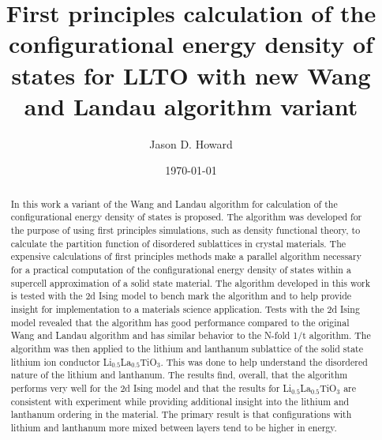 \documentclass[aps,pre,reprint,superscriptaddress,showkeys]{revtex4-1}
\begin{document}
\title{First principles calculation of the configurational energy density of states for LLTO with new Wang and Landau algorithm variant }

\author{Jason D. Howard}
\date{\today}


\begin{abstract}
In this work  a variant of the Wang and Landau algorithm   for calculation of  the configurational energy density of states is proposed. The algorithm was developed for the purpose of   using first principles simulations, such as density functional theory, to calculate the partition function of disordered sublattices in crystal materials. The expensive calculations of first principles methods make a parallel algorithm necessary for a practical computation of the configurational energy density of states within a supercell approximation of a solid state material.  The algorithm developed in this work is tested with the 2d Ising model to bench mark the algorithm and to help provide insight for implementation to a materials science application. Tests with the 2d Ising model revealed that the algorithm has good performance compared to the original Wang and Landau algorithm and has similar behavior to the N-fold 1/t algorithm. The algorithm was then applied to the lithium and lanthanum sublattice of the solid state lithium ion conductor Li$_{0.5}$La$_{0.5}$TiO$_{3}$. This was done to help understand the disordered nature of the lithium and lanthanum. The results find, overall, that the algorithm performs very well for the 2d Ising model and that the results for Li$_{0.5}$La$_{0.5}$TiO$_{3}$ are consistent with experiment while providing additional insight into the lithium and lanthanum ordering in the material. The primary result is that configurations with lithium and lanthanum more mixed between layers tend to be higher in energy. 
\end{abstract}
\maketitle
\end{document}
